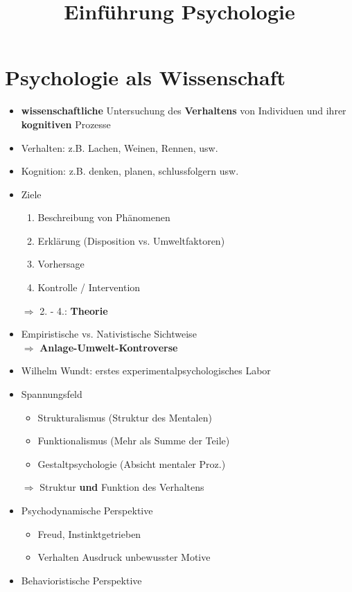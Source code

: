 \documentclass[11pt, paper=a4, twocolumn]{scrartcl}
\title{\vspace{-1.25cm}Einführung Psychologie\vspace{-0.25cm}}
\date{\vspace{-5ex}}
\begin{document}
	\maketitle


	\section{Psychologie als Wissenschaft}

	\begin{itemize}
		\item \textbf{wissenschaftliche} Untersuchung des \textbf{Verhaltens} von 
			Individuen und ihrer \textbf{kognitiven} Prozesse
		\item Verhalten: z.B. Lachen, Weinen, Rennen, usw.
		\item Kognition: z.B. denken, planen, schlussfolgern usw.
		\item Ziele
			\begin{enumerate}
				\item Beschreibung von Phänomenen
				\item Erklärung (Disposition vs. Umweltfaktoren)
				\item Vorhersage
				\item Kontrolle / Intervention
			\end{enumerate}
			$\Rightarrow$ 2. - 4.: \textbf{Theorie}
		\item Empiristische vs. Nativistische Sichtweise\\
			$\Rightarrow$ \textbf{Anlage-Umwelt-Kontroverse}
		\item Wilhelm Wundt: erstes experimentalpsychologisches Labor
		\item Spannungsfeld
			\begin{itemize}
				\item Strukturalismus (Struktur des Mentalen)
				\item Funktionalismus (Mehr als Summe der Teile)
				\item Gestaltpsychologie (Absicht mentaler Proz.)
			\end{itemize}
			$\Rightarrow$ Struktur \textbf{und} Funktion des Verhaltens
		\item Psychodynamische Perspektive
			\begin{itemize}
				\item Freud, Instinktgetrieben
				\item Verhalten Ausdruck unbewusster Motive
			\end{itemize}
		\item Behavioristische Perspektive

\end{itemize}
\end{document}

